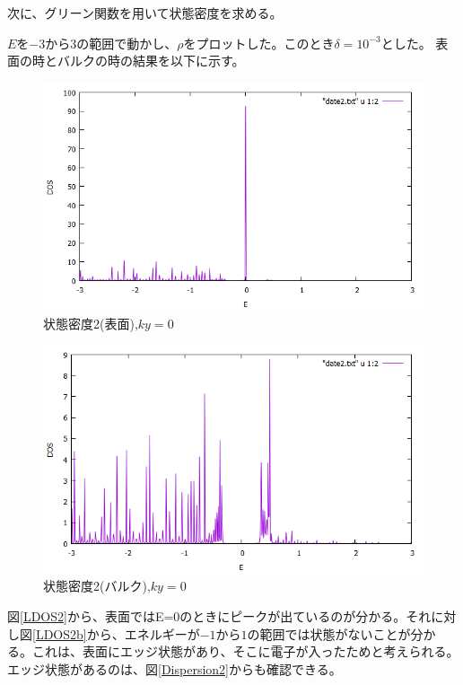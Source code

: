 \documentclass{jsarticle}
\begin{document}
            次に、グリーン関数を用いて状態密度を求める。
            
            $E$を$-3$から$3$の範囲で動かし、$\rho$をプロットした。このとき$\delta=10^{-3}$とした。
            表面の時とバルクの時の結果を以下に示す。
    
            \begin{figure}[H]
                \centering
                \includegraphics[scale=0.5]{LDOS2.png}
                \caption{状態密度2(表面),$ky=0$}
                \label{LDOS2}
            \end{figure}

            \begin{figure}[H]
                \centering
                \includegraphics[scale=0.5]{LDOS2b.png}
                \caption{状態密度2(バルク),$ky=0$}
                \label{LDOS2b}
            \end{figure}

            図\eqref{LDOS2}から、表面ではE=0のときにピークが出ているのが分かる。それに対し図\eqref{LDOS2b}から、エネルギーが$-1$から$1$の範囲では状態がないことが分かる。これは、表面にエッジ状態があり、そこに電子が入ったためと考えられる。エッジ状態があるのは、図\eqref{Dispersion2}からも確認できる。
    
\end{document}
